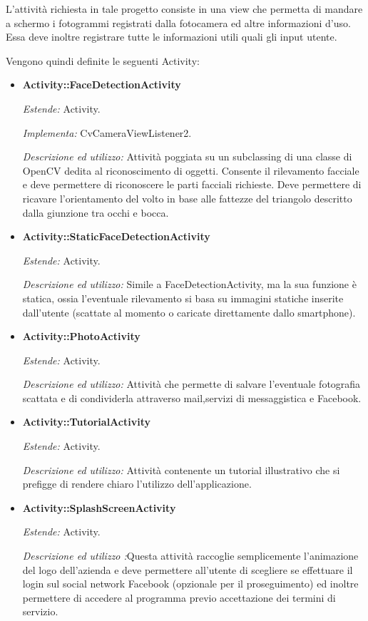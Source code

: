 L'attività richiesta in tale progetto consiste in una view che permetta di mandare a schermo i fotogrammi registrati dalla fotocamera ed altre informazioni d'uso. Essa deve inoltre registrare tutte le informazioni utili quali gli input utente.

Vengono quindi definite le seguenti Activity:
\begin{itemize}


\item \textbf{Activity::FaceDetectionActivity}

\textit{Estende:} Activity.

\textit{Implementa:} CvCameraViewListener2.

\textit{Descrizione ed utilizzo:} Attività poggiata su un subclassing di una classe di OpenCV dedita al riconoscimento di oggetti. Consente il rilevamento facciale e deve permettere di riconoscere le parti facciali richieste. Deve permettere di ricavare l'orientamento del volto in base alle fattezze del triangolo descritto dalla giunzione tra occhi e bocca.

\item \textbf{Activity::StaticFaceDetectionActivity}

\textit{Estende:} Activity. 

\textit{Descrizione ed utilizzo:} Simile a FaceDetectionActivity, ma la sua funzione è statica, ossia l'eventuale rilevamento si basa su immagini statiche inserite dall'utente (scattate al momento o caricate direttamente dallo smartphone).

\item \textbf{Activity::PhotoActivity}

\textit{Estende:} Activity.

\textit{Descrizione ed utilizzo:} Attività che permette di salvare l'eventuale fotografia scattata e di condividerla attraverso mail,servizi di messaggistica e Facebook.

\item \textbf{Activity::TutorialActivity}

\textit{Estende:} Activity.

\textit{Descrizione ed utilizzo:} Attività contenente un tutorial illustrativo che si prefigge di rendere chiaro l'utilizzo dell'applicazione.

\item \textbf{Activity::SplashScreenActivity}

\textit{Estende:} Activity.

\textit{Descrizione ed utilizzo :}Questa attività raccoglie semplicemente l'animazione del logo dell'azienda e deve permettere all'utente di scegliere se effettuare il login sul social network Facebook (opzionale per il proseguimento) ed inoltre permettere di accedere al programma previo accettazione dei termini di servizio.

\end{itemize}
